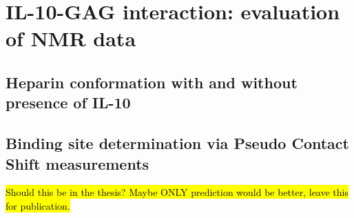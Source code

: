 \chapter{IL-10-GAG interaction: evaluation of NMR data}
\section{Heparin conformation with and without presence of IL-10}




\section{Binding site determination via Pseudo Contact Shift measurements}
\hl{Should this be in the thesis? Maybe ONLY prediction would be better,
leave this for publication.}

\lipsum[1-5]